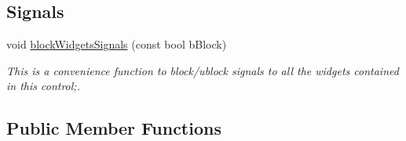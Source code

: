\subsection*{Signals}
\begin{DoxyCompactItemize}
\item 
void \hyperlink{class_catch_input_ctrl_aeb737186053f34c7b373b6d480da027d}{blockWidgetsSignals} (const bool bBlock)
\begin{DoxyCompactList}\small\item\em This is a convenience function to block/ublock signals to all the widgets contained in this control;. \item\end{DoxyCompactList}\end{DoxyCompactItemize}
\subsection*{Public Member Functions}
